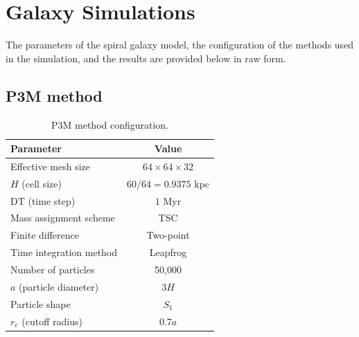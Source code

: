 \section{Galaxy Simulations}
The parameters of the spiral galaxy model, the configuration of the methods used in the simulation, and the results are provided below in raw form.
\subsection{P3M method}
\begin{table}[H]
    \centering
    \caption{P3M method configuration.}
    \label{tab:p3m-method-parameters}
    \begin{tabular}{lc}
        \toprule
        \textbf{Parameter}      & \textbf{Value}           \\
        \midrule
        Effective mesh size     & $64 \times 64 \times 32$ \\
        $H$ (cell size)         & $60/64=0.9375$ kpc       \\
        DT (time step)          & $1$ Myr                  \\
        Mass assignment scheme  & TSC                      \\
        Finite difference       & Two-point                \\
        Time integration method & Leapfrog                 \\
        Number of particles     & 50,000                   \\
        $a$ (particle diameter) & $3H$                     \\
        Particle shape          & $S_1$                    \\
        $r_e$ (cutoff radius)   & $0.7a$                   \\
        \bottomrule
    \end{tabular}
\end{table}

